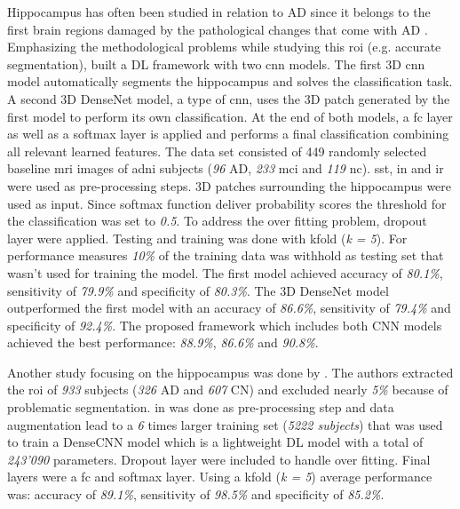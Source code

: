 Hippocampus has often been studied in relation to \gls{AD} since it belongs to the first brain regions damaged by the pathological changes that come with \gls{AD} \autocite{liuMultimodelDeepConvolutional2020a}. Emphasizing the methodological problems while studying this \gls{roi} (e.g. accurate segmentation), \textcite{liuMultimodelDeepConvolutional2020a} built a \gls{DL} framework with two \gls{cnn} models. The first 3D \gls{cnn} model automatically segments the hippocampus and solves the classification task. A second 3D DenseNet model, a type of \gls{cnn},  uses the 3D patch generated by the first model to perform its own classification. At the end of both models, a \gls{fc} layer as well as a softmax layer is applied and performs a final classification combining all relevant learned features. The data set consisted of 449 randomly selected baseline \gls{mri} images of \gls{adni} subjects (\textit{96} AD, \textit{233} \gls{mci} and \textit{119} \gls{nc}). \gls{sst}, \gls{in} and \gls{ir} were used as pre-processing steps. 3D patches surrounding the hippocampus were used as input. Since softmax function deliver probability scores the threshold for the classification was set to \textit{0.5}. To address the over fitting problem, dropout layer were applied. Testing and training was done with \gls{kfold} (\textit{k = 5}). For performance measures \textit{10\%} of the training data was withhold as testing set that wasn't used for training the model. The first model achieved accuracy of \textit{80.1\%}, sensitivity of \textit{79.9\%} and specificity of \textit{80.3\%}. The 3D DenseNet model outperformed the first model with an accuracy of \textit{86.6\%}, sensitivity of \textit{79.4\%} and specificity of \textit{92.4\%}. The proposed framework which includes both CNN models achieved the best performance: \textit{88.9\%}, \textit{86.6\%} and \textit{90.8\%}.




Another study focusing on the hippocampus was done by \textcite{wangDenseCNNDenselyConnected2021}. The authors extracted the \gls{roi} of \textit{933} subjects (\textit{326} AD and \textit{607} CN) and excluded nearly \textit{5\%} because of problematic segmentation. \gls{in} was done as pre-processing step and data augmentation lead to a \textit{6} times larger training set (\textit{5222 subjects}) that was used to train a DenseCNN model which is a lightweight DL model with a total of \textit{243'090} parameters. Dropout layer were included to handle over fitting. Final layers were a \gls{fc} and softmax layer. Using a \gls{kfold} (\textit{k = 5}) average performance was: accuracy of \textit{89.1\%}, sensitivity of \textit{98.5\%} and specificity of \textit{85.2\%}.


